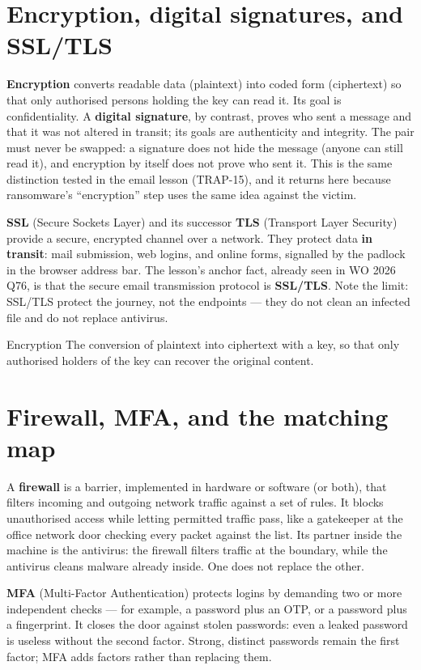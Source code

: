 \section{Encryption, digital signatures, and SSL/TLS}
\textbf{Encryption} converts readable data (plaintext) into coded form
(ciphertext) so that only authorised persons holding the key can read it.
Its goal is confidentiality. A \textbf{digital signature}, by contrast,
proves who sent a message and that it was not altered in transit; its goals
are authenticity and integrity. The pair must never be swapped: a signature
does not hide the message (anyone can still read it), and encryption by
itself does not prove who sent it. This is the same distinction tested in
the email lesson (TRAP-15), and it returns here because ransomware's
``encryption'' step uses the same idea against the victim.

\textbf{SSL} (Secure Sockets Layer) and its successor \textbf{TLS}
(Transport Layer Security) provide a secure, encrypted channel over a
network. They protect data \textbf{in transit}: mail submission, web
logins, and online forms, signalled by the padlock in the browser address
bar. The lesson's anchor fact, already seen in WO 2026 Q76, is that the
secure email transmission protocol is \textbf{SSL/TLS}. Note the limit:
SSL/TLS protect the journey, not the endpoints --- they do not clean an
infected file and do not replace antivirus.

\begin{definitionbox}{Encryption}
The conversion of plaintext into ciphertext with a key, so that only
authorised holders of the key can recover the original content.
\end{definitionbox}

\section{Firewall, MFA, and the matching map}
A \textbf{firewall} is a barrier, implemented in hardware or software (or
both), that filters incoming and outgoing network traffic against a set of
rules. It blocks unauthorised access while letting permitted traffic pass,
like a gatekeeper at the office network door checking every packet against
the list. Its partner inside the machine is the antivirus: the firewall
filters traffic at the boundary, while the antivirus cleans malware already
inside. One does not replace the other.

\textbf{MFA} (Multi-Factor Authentication) protects logins by demanding two
or more independent checks --- for example, a password plus an OTP, or a
password plus a fingerprint. It closes the door against stolen passwords:
even a leaked password is useless without the second factor. Strong,
distinct passwords remain the first factor; MFA adds factors rather than
replacing them.

